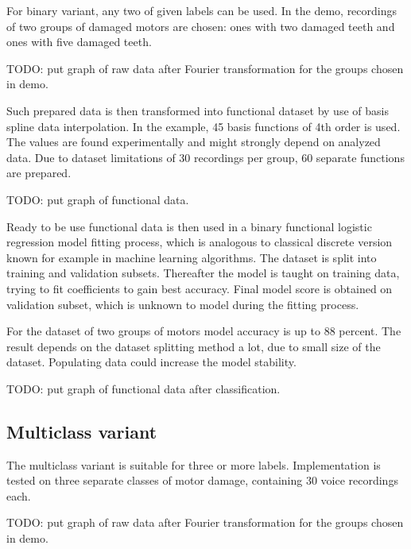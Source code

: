 \documentclass[energies,article,submit,pdftex,moreauthors]{Definitions/mdpi}
\begin{document}
For binary variant, any two of given labels can be used. In the demo, recordings of two groups of damaged motors are chosen: ones with two damaged teeth and ones with five damaged teeth. 

\vspace{5mm}
TODO: put graph of raw data after Fourier transformation for the groups chosen in demo.
\vspace{5mm}

Such prepared data is then transformed into functional dataset by use of basis spline data interpolation. In the example, 45 basis functions of 4th order is used. The values are found experimentally and might strongly depend on analyzed data. Due to dataset limitations of 30 recordings per group, 60 separate functions are prepared.

\vspace{5mm}
TODO: put graph of functional data.
\vspace{5mm}

Ready to be use functional data is then used in a binary functional logistic regression model fitting process, which is analogous to classical discrete version known for example in machine learning algorithms. The dataset is split into training and validation subsets. Thereafter the model is taught on training data, trying to fit coefficients to gain best accuracy. Final model score is obtained on validation subset, which is unknown to model during the fitting process.

For the dataset of two groups of motors model accuracy is up to 88 percent. The result depends on the dataset splitting method a lot, due to small size of the dataset. Populating data could increase the model stability. 

\vspace{5mm}
TODO: put graph of functional data after classification.
\vspace{5mm}

\subsection{Multiclass variant}

The multiclass variant is suitable for three or more labels. Implementation is tested on three separate classes of motor damage, containing 30 voice recordings each.

\vspace{5mm}
TODO: put graph of raw data after Fourier transformation for the groups chosen in demo.
\vspace{5mm}
\end{document}

